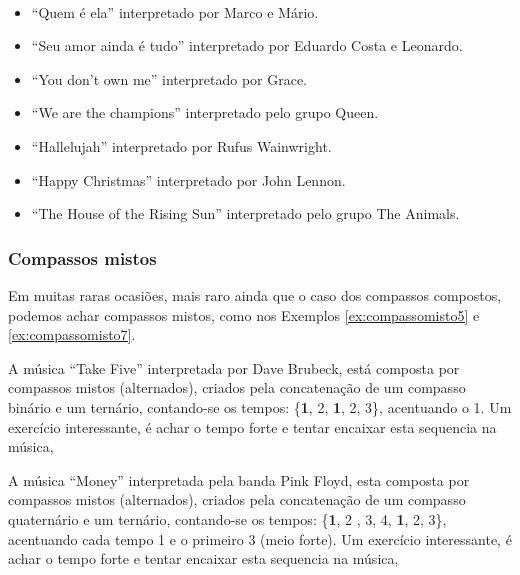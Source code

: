 \begin{example}
\label{ex:compassocomposto6b}
~
\begin{itemize}
\item ``Quem é ela'' interpretado por Marco e Mário.
\item ``Seu amor ainda é tudo'' interpretado por Eduardo Costa e Leonardo.
\item ``You don't own me'' interpretado por Grace.
\item ``We are the champions'' interpretado pelo grupo Queen.
\item ``Hallelujah'' interpretado por Rufus Wainwright.
\item ``Happy Christmas'' interpretado por John Lennon.
\item ``The House of the Rising Sun'' interpretado pelo grupo  The Animals.
\end{itemize}
\end{example}

\subsubsection{Compassos mistos}
Em muitas raras ocasiões, mais raro ainda que o caso dos compassos compostos, 
podemos achar compassos mistos, como nos Exemplos \ref{ex:compassomisto5} e \ref{ex:compassomisto7}.

\begin{example}
\label{ex:compassomisto5}
A música ``Take Five'' interpretada por  Dave Brubeck,
está composta por compassos mistos (alternados), criados pela concatenação de um compasso binário e um ternário,
contando-se os tempos: \{\textbf{1}, 2, \textbf{1}, 2, 3\}, acentuando o 1.
Um exercício interessante, é achar o tempo forte  e tentar encaixar esta sequencia na música, 
\end{example}

\begin{example}
\label{ex:compassomisto7}
A música ``Money'' interpretada pela banda  Pink Floyd,
esta composta por compassos mistos (alternados), criados pela concatenação de um compasso quaternário e um ternário,
contando-se os tempos: \{\textbf{1}, 2 , 3, 4, \textbf{1}, 2, 3\}, acentuando cada tempo 1 e o primeiro 3 (meio forte).
Um exercício interessante, é achar o tempo forte  e tentar encaixar esta sequencia na música, 
\end{example}
